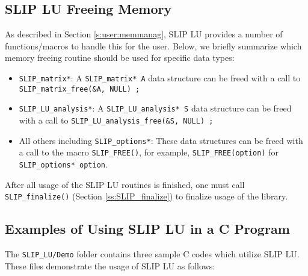 \documentclass[12pt]{article}
\theoremstyle{definition}
\begin{document}
\cprotect\subsection{SLIP LU Freeing Memory}
\label{s:Using:free}

As described in Section \ref{s:user:memmanag}, SLIP LU provides a number
of functions/macros to handle this for the user. Below, we briefly summarize
which memory freeing routine should be used for specific data types:

\begin{itemize}
\item \verb|SLIP_matrix*|: A \verb|SLIP_matrix* A| data structure can be freed
with a call to \verb|SLIP_matrix_free(&A, NULL) ;|

\item \verb|SLIP_LU_analysis*|: A \verb|SLIP_LU_analysis* S| data structure can
be freed with a call to \verb|SLIP_LU_analysis_free(&S, NULL) ;|

\item All others including \verb|SLIP_options*|: These data structures can be
freed with a call to the macro \verb|SLIP_FREE()|, for example,
\verb|SLIP_FREE(option)| for \newline
\verb|SLIP_options* option|.

\end{itemize}

After all usage of the SLIP LU routines is finished, one must call
\verb|SLIP_finalize()| (Section \ref{ss:SLIP_finalize}) to finalize usage of
the library.

\cprotect\subsection{Examples of Using SLIP LU in a C Program}
\label{s:Using:Examples}

The \verb|SLIP_LU/Demo| folder contains three sample C codes which utilize SLIP
LU. These files demonstrate the usage of SLIP LU as follows:
\end{document}
